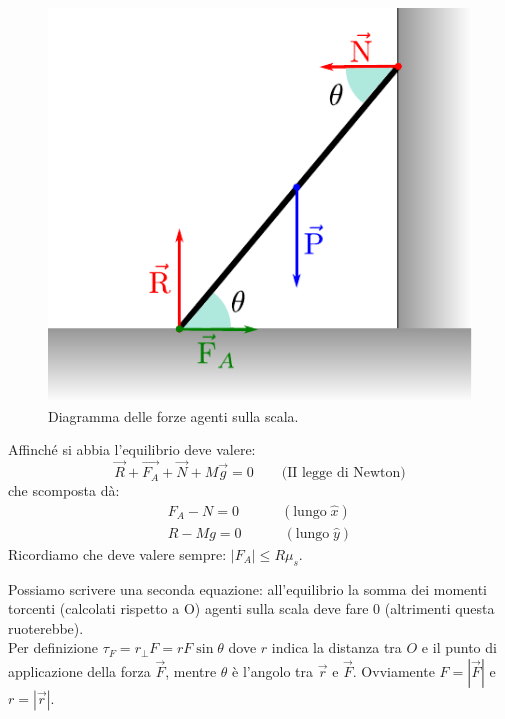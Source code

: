 \documentclass[12pt,a4paper]{book}
\begin{document}
\begin{figure}[!ht]
 \centering
\includegraphics[scale=1]{scala2.pdf}
\caption{Diagramma delle forze agenti sulla scala. \label{fig:scala2} }
\end{figure}


Affinché si abbia l'equilibrio deve valere:
\begin{equation*}
\vec{R} + \vec{F_A} + \vec{N} + M \vec{g}=0 \qquad \text{(II legge di Newton)}
\end{equation*}
che scomposta dà:
\begin{gather*}
F_A - N=0  \qquad \quad (\text{lungo}\;\hat{x}) \\
R - Mg=0  \qquad \quad (\text{lungo}\;\hat{y}) 
\end{gather*}
Ricordiamo che deve valere sempre: $|F_A|\leq R \mu_s$. 

Possiamo scrivere una seconda equazione: all'equilibrio la somma dei momenti torcenti (calcolati rispetto a O) agenti sulla scala deve fare 0 (altrimenti questa ruoterebbe). \\
Per definizione $\tau_F=r_{\perp}F=rF\sin \theta$ dove $r$ indica la distanza tra $O$ e il punto di applicazione della forza $\vec{F}$, mentre $\theta$ è l'angolo tra $\vec{r}$ e $\vec{F}$. Ovviamente $F=|\vec{F}|$ e $r=|\vec{r}|$.
\end{document}

